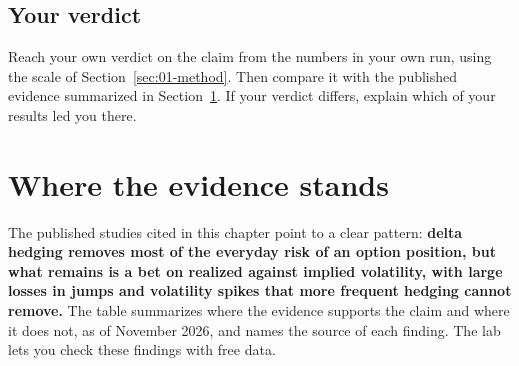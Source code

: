\subsection*{Your verdict}

Reach your own verdict on the claim from the numbers in your own run, using the scale of Section~\ref{sec:01-method}. Then compare it with the published evidence summarized in Section~\ref{sec:14-verdict}. If your verdict differs, explain which of your results led you there.

\section{Where the evidence stands}
\label{sec:14-verdict}

The published studies cited in this chapter point to a clear pattern: \textbf{delta hedging removes most of the everyday risk of an option position, but what remains is a bet on realized against implied volatility, with large losses in jumps and volatility spikes that more frequent hedging cannot remove.} The table summarizes where the evidence supports the claim and where it does not, as of November 2026, and names the source of each finding. The lab lets you check these findings with free data.

